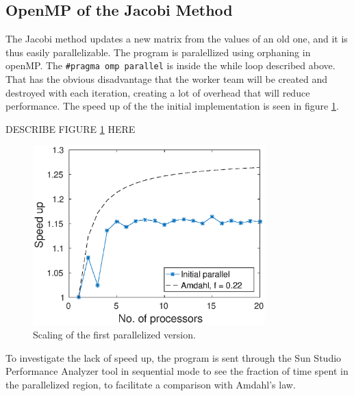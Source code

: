 \subsection{OpenMP of the Jacobi Method}
The Jacobi method updates a new matrix from the values of an old one, and it is thus easily parallelizable. The program is paralellized using orphaning in openMP. The \texttt{\#pragma omp parallel} is inside the while loop described above. That has the obvious disadvantage that the worker team will be created and destroyed with each iteration, creating a lot of overhead that will reduce performance. The speed up of the the initial implementation is seen in figure \ref{fig:omp_scale1}. \begin{huge}
DESCRIBE FIGURE \ref{fig:omp_scale1} HERE
\end{huge}

\begin{figure}
\centering
\includegraphics[width = 0.8\textwidth]{fig/speedup_omp.eps}
\caption{Scaling of the first parallelized version.}
\label{fig:omp_scale1}
\end{figure}

To investigate the lack of speed up, the program is sent through the Sun Studio Performance Analyzer tool in sequential mode to see the fraction of time  spent in the parallelized region, to facilitate a comparison with Amdahl's law. 